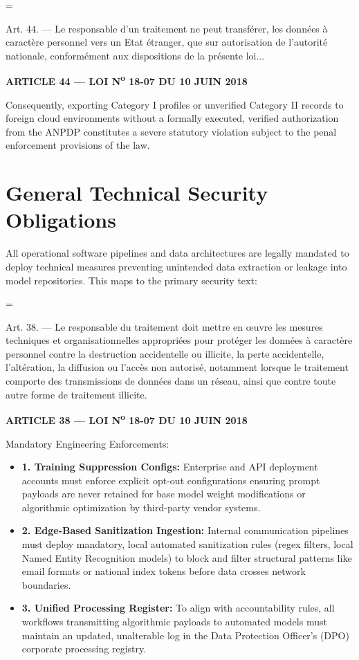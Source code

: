 \documentclass[11pt,a4paper]{article}
\newenvironment{legalquote}{
    \begin{list}{}{
        \leftmargin=0.5in
        \rightmargin=0in
        \topsep=6pt
        \partopsep=0pt
        \parsep=\parskip
    }
    \item[]\itshape
}{
    \end{list}
}
\begin{document}
\begin{legalquote}
    Art. 44. — Le responsable d'un traitement ne peut transférer, les données à caractère personnel vers un Etat étranger, que sur autorisation de l'autorité nationale, conformément aux dispositions de la présente loi...
\end{legalquote}
\hfill {\footnotesize\bfseries ARTICLE 44 — LOI N\textsuperscript{o} 18-07 DU 10 JUIN 2018}

Consequently, exporting Category I profiles or unverified Category II records to foreign cloud environments without a formally executed, verified authorization from the ANPDP constitutes a severe statutory violation subject to the penal enforcement provisions of the law.

\section{General Technical Security Obligations}
All operational software pipelines and data architectures are legally mandated to deploy technical measures preventing unintended data extraction or leakage into model repositories. This maps to the primary security text:

\begin{legalquote}
    Art. 38. — Le responsable du traitement doit mettre en œuvre les mesures techniques et organisationnelles appropriées pour protéger les données à caractère personnel contre la destruction accidentelle ou illicite, la perte accidentelle, l'altération, la diffusion ou l'accès non autorisé, notamment lorsque le traitement comporte des transmissions de données dans un réseau, ainsi que contre toute autre forme de traitement illicite.
\end{legalquote}
\hfill {\footnotesize\bfseries ARTICLE 38 — LOI N\textsuperscript{o} 18-07 DU 10 JUIN 2018}

Mandatory Engineering Enforcements:
\begin{itemize}[leftmargin=0.5in, topsep=0pt, itemsep=4pt]
    \item \textbf{1. Training Suppression Configs:} Enterprise and API deployment accounts must enforce explicit opt-out configurations ensuring prompt payloads are never retained for base model weight modifications or algorithmic optimization by third-party vendor systems.
    \item \textbf{2. Edge-Based Sanitization Ingestion:} Internal communication pipelines must deploy mandatory, local automated sanitization rules (regex filters, local Named Entity Recognition models) to block and filter structural patterns like email formats or national index tokens before data crosses network boundaries.
    \item \textbf{3. Unified Processing Register:} To align with accountability rules, all workflows transmitting algorithmic payloads to automated models must maintain an updated, unalterable log in the Data Protection Officer's (DPO) corporate processing registry.
\end{itemize}
\end{document}
